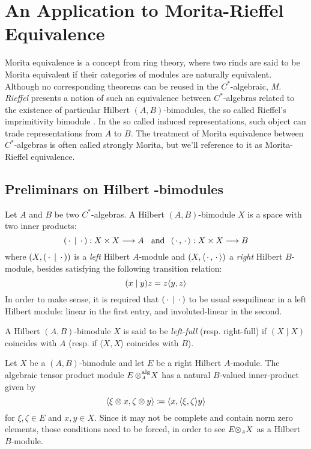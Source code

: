 \chapter{An Application to Morita-Rieffel Equivalence}

Morita equivalence is a concept from ring theory, where two rinds are said to be Morita equivalent if their categories of modules are naturally equivalent. Although no corresponding theorems can be reused in the $C^*$-algebraic, \textit{M. Rieffel} presents a notion of such an equivalence between $C^*$-algebras related to the existence of particular Hilbert $(A,B)$-bimodules, the so called Rieffel's imprimitivity bimodule \cite{rieffel1981c,RIEFFEL1974176, brown1977stable}. In the so called induced representations, such object can trade representations from $A$ to $B$. The treatment of Morita equivalence between $C^*$-algebras is often called strongly Morita, but we'll reference to it as Morita-Rieffel equivalence.

\section[Preliminars on Hilbert \texorpdfstring{\ensuremath{C^*}}{C*}-bimodules]{Preliminars on Hilbert \texorpdfstring{}{C*}-bimodules}

Let $A$ and $B$ be two $C^*$-algebras. A Hilbert $(A,B)$-bimodule $X$ is a space with two inner products:
\begin{equation*}
	(\operatorname{\,\cdot\,}\mid\operatorname{\,\cdot\,}):X\times X \longrightarrow A \hspace{0.25cm}\operatorname{and}\hspace{0.25cm} \langle {\operatorname{\,\cdot\,}},{\operatorname{\,\cdot\,}}\rangle:X\times X \longrightarrow B
\end{equation*} 
where $\left(X, (\operatorname{\,\cdot\,}\mid\operatorname{\,\cdot\,})\right)$ is a \textit{left} Hilbert $A$-module and $\left(X, \langle {\operatorname{\,\cdot\,}},{\operatorname{\,\cdot\,}}\rangle\right)$ a \textit{right} Hilbert $B$-module, besides satisfying the following transition relation:
\begin{equation*}
	(x\mid y)z = z \langle {y},{z}\rangle
\end{equation*}
In order to make sense, it is required that $(\operatorname{\,\cdot\,}\mid\operatorname{\,\cdot\,})$ to be usual sesquilinear in a left Hilbert module: linear in the first entry, and involuted-linear in the second.

\begin{definicao}
	A Hilbert $(A,B)$-bimodule $X$ is said to be \textit{left-full} (resp. right-full) if $(X \mid X)$ coincides with $A$ (resp. if $\langle X, X\rangle$ coincides with $B$).
\end{definicao}

Let $X$ be a $(A,B)$-bimodule and let $E$ be a right Hilbert $A$-module. The algebraic tensor product module $E\,\sub\otimes A^{\text{alg}} X$ has a natural $B$-valued inner-product given by
\begin{equation*}
	\langle {\xi\otimes x},{\zeta \otimes y}\rangle \coloneqq \langle {x},{\langle {\xi},{\zeta}\rangle y}\rangle
\end{equation*}
for $\xi,\zeta\in E$ and $x,y\in X$. Since it may not be complete and contain norm zero elements, those conditions need to be forced, in order to see $E \sub\otimes A X$ as a Hilbert $B$-module.

